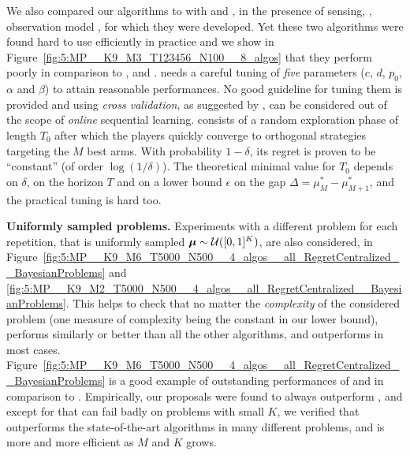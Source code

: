 We also compared our algorithms to  %
with \MEGA{} \citep{Avner15} and \MusicalChair{} \citep{Rosenski16}, in the presence of sensing, \ie, observation model \modeldeux, for which they were developed.
Yet these two algorithms were found hard to use efficiently in practice and we show in
%
Figure~\ref{fig:5:MP__K9_M3_T123456_N100__8_algos} that they perform poorly in comparison to \rhoRand, \RandTopM{} and \MCTopM.
%
\MEGA{} needs a careful tuning of \emph{five} parameters ($c$, $d$, $p_0$, $\alpha$ and $\beta$) to attain reasonable performances. No good guideline for tuning them is provided and using \emph{cross validation}, as suggested by \cite{Avner15},
can be considered out of the scope of \emph{online} sequential learning.
%
\MusicalChair{} consists of a random exploration phase of length $T_0$ after which the players quickly converge to orthogonal strategies targeting the $M$ best arms. With probability $1-\delta$, its regret is proven to be ``constant'' (of order $\log(1/\delta)$). The theoretical minimal value for $T_0$ depends on $\delta$, on the horizon $T$ and on a lower bound $\epsilon$ on the gap $\Delta = \mu^*_M - \mu^*_{M+1}$, and the practical tuning is hard too. %


\textbf{Uniformly sampled problems.}
%
Experiments with a different problem for each repetition,
that is uniformly sampled $\boldsymbol{\mu} \sim \mathcal{U}([0,1]^K)$,
are also considered, in Figure~\ref{fig:5:MP__K9_M6_T5000_N500__4_algos__all_RegretCentralized__BayesianProblems} and \ref{fig:5:MP__K9_M2_T5000_N500__4_algos__all_RegretCentralized__BayesianProblems}.
This helps to check that no matter the \emph{complexity} of the considered problem (one measure of complexity being the constant in our lower bound),
\MCTopM{} performs similarly or better than all the other algorithms,
and \Selfish{} outperforms \rhoRand{} in most cases.
Figure~\ref{fig:5:MP__K9_M6_T5000_N500__4_algos__all_RegretCentralized__BayesianProblems} is a good example
of outstanding performances of \MCTopM{} and \Selfish{} in comparison to \rhoRand{}.
%
Empirically, our proposals were found to always outperform \rhoRand{}, and except for \Selfish{} that can fail badly on problems with small $K$,
we verified that \MCTopM{} outperforms the state-of-the-art algorithms in many different problems, and is more and more efficient as $M$ and $K$ grows.

